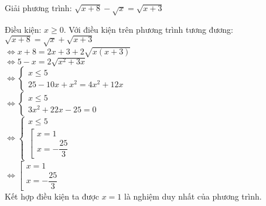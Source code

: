 \begin{baitap}
 Giải phương trình: $ \sqrt{x+8 } - \sqrt{x } = \sqrt{x + 3}    $
\begin{loigiai1}
Điều kiện: $ x \geq 0 $.
Với điều kiện trên phương trình tương đương: $ \sqrt{x+8 } = \sqrt{x } + \sqrt{x + 3}  $ \\
$ \Leftrightarrow x+8 = 2x +3 + 2 \sqrt{x(x+3 ) } $ \\
$ \Leftrightarrow 5-x = 2 \sqrt{x^2 + 3x } $ \\
$ \Leftrightarrow \begin{cases}
    x \leq 5 \\
    25 -10x + x^2 = 4x^2 + 12x
\end{cases} $ \\
$ \Leftrightarrow \begin{cases}
    x \leq 5 \\
    3x^2 +22x -25 =0
\end{cases} $ \\
$ \Leftrightarrow \begin{cases}
    x \leq 5 \\
    \left[
        \begin{array}{l}
            x =1 \\
            x= -\dfrac{25 }{3 }  
        \end{array}
    \right. 
\end{cases} $ \\
$ \Leftrightarrow \left[
    \begin{array}{l}
        x =1 \\
        x=-\dfrac{25 }{3 }  
    \end{array}
\right. $ \\
Kết hợp điều kiện ta được $x=1$ là nghiệm duy nhất của phương trình.
\end{loigiai1}

\end{baitap}

